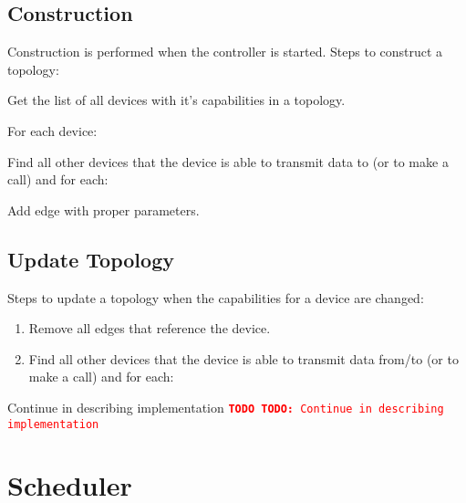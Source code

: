 \documentclass[a4paper]{report}
\newcommand{\TODO}[1]{%
\def\empty{}%
\def\prvniparametr{#1}%
\ifx\prvniparametr\empty%
\begingroup\tt\textcolor{red}{\noindent\textbf{TODO}}\endgroup
\else%
\begingroup\tt\textcolor{red}{\noindent\textbf{TODO:}\ #1}\endgroup
\fi%
}
\begin{document}
\section{Construction}

Construction is performed when the controller is started. Steps to construct a topology:

\begin{enumerate}

\item Get the list of all devices with it's capabilities in a topology.

\item For each device: 
  \begin{compactitem}
  \item Find all other devices that the device is able to transmit
  data to (or to make a call) and for each:
    \begin{compactitem}
    \item Add edge with proper parameters.
    \end{compactitem}
  \end{compactitem}

\end{enumerate}     
     
\section{Update Topology}     

Steps to update a topology when the capabilities for a device are changed:
\begin{enumerate}

\item Remove all edges that reference the device.

\item Find all other devices that the device is able to transmit data from/to
   (or to make a call) and for each:

\end{enumerate}  

\TODO{Continue in describing implementation}


\chapter{Scheduler}
\end{document}
